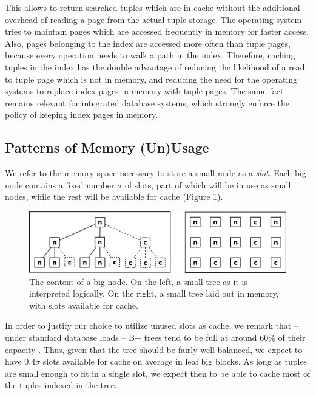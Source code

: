 \documentclass{article}
\begin{document}
This allows to return searched tuples which are in cache without the additional overhead of reading a page from
the actual tuple storage.
The operating system tries to maintain pages which are accessed frequently in memory for faster
access.
Also, pages belonging to the index are accessed more often than tuple pages, because every operation
needs to walk a path in the index.
Therefore, caching tuples in the index has the double advantage of reducing the likelihood
of a read to tuple page which is not in memory, and reducing the need for the operating systems
to replace index pages in memory with tuple pages.
The same fact remains relevant for integrated database systems, which strongly enforce the policy of keeping
index pages in memory.


\subsection{Patterns of Memory (Un)Usage}

We refer to the memory space necessary to store a small node as a \textit{slot}.
Each big node contains a fixed number $\sigma$ of slots, part of which will be in use
as small nodes, while the rest will be available for cache (Figure \ref{fig:inner_block}).
\begin{figure}[h]
\begin{center}
\includegraphics[width=350pt]{inner_block}
\end{center}
\caption{
The content of a big node.
On the left, a small tree as it is interpreted logically.
On the right, a small tree laid out in memory, with slots available for cache.
}
\label{fig:inner_block}
\end{figure}

In order to justify our choice to utilize unused slots as cache,
we remark that -- under standard database loads --
B+ trees tend to be full at around 60\% of their capacity \citep{Wu:2011}.
Thus, given that the tree should be fairly well balanced,
we expect to have $0.4 \sigma$ slots available for cache on average in leaf big blocks.
As long as tuples are small enough to fit in a single slot,
we expect then to be able to cache most of the tuples indexed in the tree.
\end{document}
